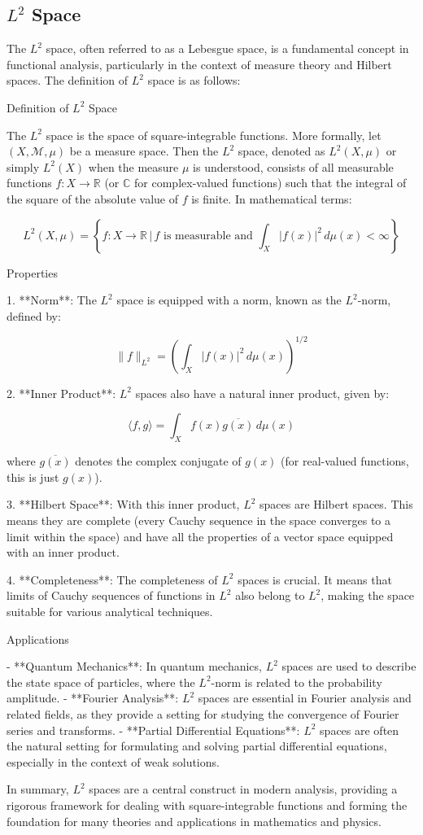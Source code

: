 \documentclass[a4paper,12pt]{article} %
\begin{document}
\subsection{$L^2$ Space}
The \( L^2 \) space, often referred to as a Lebesgue space, is a fundamental concept in functional analysis, particularly in the context of measure theory and Hilbert spaces. The definition of \( L^2 \) space is as follows:

Definition of \( L^2 \) Space

The \( L^2 \) space is the space of square-integrable functions. More formally, let \( (X, \mathcal{M}, \mu) \) be a measure space. Then the \( L^2 \) space, denoted as \( L^2(X, \mu) \) or simply \( L^2(X) \) when the measure \( \mu \) is understood, consists of all measurable functions \( f: X \rightarrow \mathbb{R} \) (or \( \mathbb{C} \) for complex-valued functions) such that the integral of the square of the absolute value of \( f \) is finite. In mathematical terms:

\[
L^2(X, \mu) = \left\{ f: X \rightarrow \mathbb{R} \, \bigg| \, f \text{ is measurable and } \int_X |f(x)|^2 \, d\mu(x) < \infty \right\}
\]

Properties

1. **Norm**: The \( L^2 \) space is equipped with a norm, known as the \( L^2 \)-norm, defined by:

   \[
   \|f\|_{L^2} = \left( \int_X |f(x)|^2 \, d\mu(x) \right)^{1/2}
   \]

2. **Inner Product**: \( L^2 \) spaces also have a natural inner product, given by:

   \[
   \langle f, g \rangle = \int_X f(x) \overline{g(x)} \, d\mu(x)
   \]

   where \( \overline{g(x)} \) denotes the complex conjugate of \( g(x) \) (for real-valued functions, this is just \( g(x) \)).

3. **Hilbert Space**: With this inner product, \( L^2 \) spaces are Hilbert spaces. This means they are complete (every Cauchy sequence in the space converges to a limit within the space) and have all the properties of a vector space equipped with an inner product.

4. **Completeness**: The completeness of \( L^2 \) spaces is crucial. It means that limits of Cauchy sequences of functions in \( L^2 \) also belong to \( L^2 \), making the space suitable for various analytical techniques.

Applications

- **Quantum Mechanics**: In quantum mechanics, \( L^2 \) spaces are used to describe the state space of particles, where the \( L^2 \)-norm is related to the probability amplitude.
- **Fourier Analysis**: \( L^2 \) spaces are essential in Fourier analysis and related fields, as they provide a setting for studying the convergence of Fourier series and transforms.
- **Partial Differential Equations**: \( L^2 \) spaces are often the natural setting for formulating and solving partial differential equations, especially in the context of weak solutions.

In summary, \( L^2 \) spaces are a central construct in modern analysis, providing a rigorous framework for dealing with square-integrable functions and forming the foundation for many theories and applications in mathematics and physics.
\end{document}

